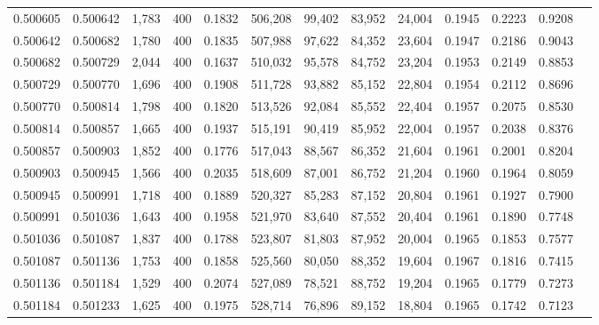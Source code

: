 \begin{tabular}{rrrrrrrrrrrrr}
0.500605 & 0.500642 & 1,783 & 400 &                                     0.1832 & 506,208 &  99,402 &  83,952 &  24,004 & 0.1945 & 0.2223 & 0.9208 \\
0.500642 & 0.500682 & 1,780 & 400 &                                     0.1835 & 507,988 &  97,622 &  84,352 &  23,604 & 0.1947 & 0.2186 & 0.9043 \\
0.500682 & 0.500729 & 2,044 & 400 &                                     0.1637 & 510,032 &  95,578 &  84,752 &  23,204 & 0.1953 & 0.2149 & 0.8853 \\
0.500729 & 0.500770 & 1,696 & 400 &                                     0.1908 & 511,728 &  93,882 &  85,152 &  22,804 & 0.1954 & 0.2112 & 0.8696 \\
0.500770 & 0.500814 & 1,798 & 400 &                                     0.1820 & 513,526 &  92,084 &  85,552 &  22,404 & 0.1957 & 0.2075 & 0.8530 \\
0.500814 & 0.500857 & 1,665 & 400 &                                     0.1937 & 515,191 &  90,419 &  85,952 &  22,004 & 0.1957 & 0.2038 & 0.8376 \\
0.500857 & 0.500903 & 1,852 & 400 &                                     0.1776 & 517,043 &  88,567 &  86,352 &  21,604 & 0.1961 & 0.2001 & 0.8204 \\
0.500903 & 0.500945 & 1,566 & 400 &                                     0.2035 & 518,609 &  87,001 &  86,752 &  21,204 & 0.1960 & 0.1964 & 0.8059 \\
0.500945 & 0.500991 & 1,718 & 400 &                                     0.1889 & 520,327 &  85,283 &  87,152 &  20,804 & 0.1961 & 0.1927 & 0.7900 \\
0.500991 & 0.501036 & 1,643 & 400 &                                     0.1958 & 521,970 &  83,640 &  87,552 &  20,404 & 0.1961 & 0.1890 & 0.7748 \\
0.501036 & 0.501087 & 1,837 & 400 &                                     0.1788 & 523,807 &  81,803 &  87,952 &  20,004 & 0.1965 & 0.1853 & 0.7577 \\
0.501087 & 0.501136 & 1,753 & 400 &                                     0.1858 & 525,560 &  80,050 &  88,352 &  19,604 & 0.1967 & 0.1816 & 0.7415 \\
0.501136 & 0.501184 & 1,529 & 400 &                                     0.2074 & 527,089 &  78,521 &  88,752 &  19,204 & 0.1965 & 0.1779 & 0.7273 \\
0.501184 & 0.501233 & 1,625 & 400 &                                     0.1975 & 528,714 &  76,896 &  89,152 &  18,804 & 0.1965 & 0.1742 & 0.7123 \\

\end{tabular}
